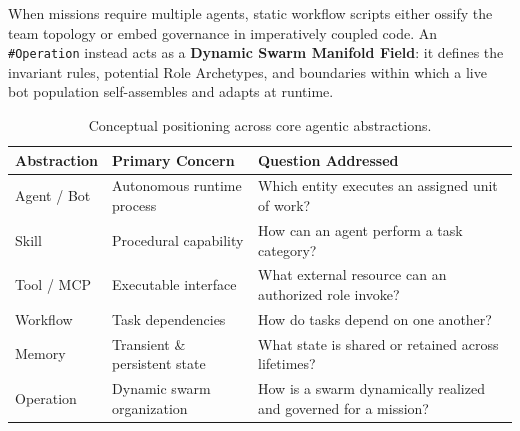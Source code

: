\documentclass[11pt,a4paper]{article}
\begin{document}
When missions require multiple agents, static workflow scripts either ossify the team topology or embed governance in imperatively coupled code. An \texttt{\#Operation} instead acts as a \textbf{Dynamic Swarm Manifold Field}: it defines the invariant rules, potential Role Archetypes, and boundaries within which a live bot population self-assembles and adapts at runtime.

\begin{table}[h]
\centering
\small
\begin{tabular}{@{}lll@{}}
\toprule
\textbf{Abstraction} & \textbf{Primary Concern} & \textbf{Question Addressed} \\
\midrule
Agent / Bot & Autonomous runtime process & Which entity executes an assigned unit of work? \\
Skill & Procedural capability & How can an agent perform a task category? \\
Tool / MCP & Executable interface & What external resource can an authorized role invoke? \\
Workflow & Task dependencies & How do tasks depend on one another? \\
Memory & Transient \& persistent state & What state is shared or retained across lifetimes? \\
Operation & Dynamic swarm organization & How is a swarm dynamically realized and governed for a mission? \\
\bottomrule
\end{tabular}
\caption{Conceptual positioning across core agentic abstractions.}
\end{table}
\end{document}
